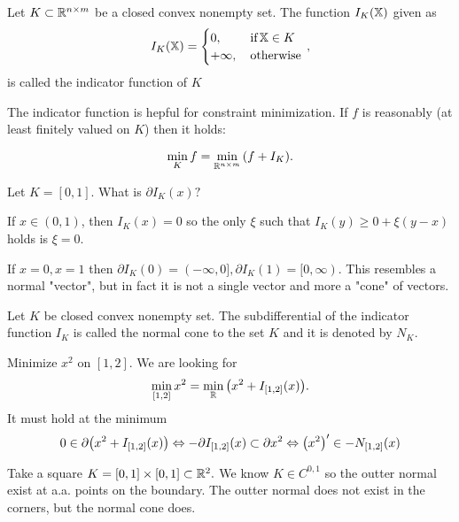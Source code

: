 \documentclass[11pt]{scrartcl} %
\begin{document}
\begin{definition}
    Let $K \subset \R^{n \times m}$ be a closed convex nonempty set. The function $I_K\qty(\tensorq{X})$ given as
    \[
	    I_K\qty(\tensorq{X})=\begin{cases}
		    0, & \, \text{if} \, \tensorq{X} \in K \\
		    + \infty,& \, \text{otherwise} \,
	    \end{cases},
    \]
    is called the indicator function of $K$
\end{definition}

The indicator function is hepful for constraint minimization. If $f$ is reasonably (at least finitely valued on $K$) then it holds:

\[
	\min_K f = \min_{\R^{n \times m}}\qty(f + I_K).
\]

\begin{example}

	Let $K = [0,1].$ What is $\partial I_K(x)?$ 

	If $x \in (0,1)$, then $I_K(x) = 0$ so the only $\xi$ such that $I_K(y) \geq 0 + \xi (y-x)$ holds is $\xi = 0.$

	If $x = 0, x=1$ then $\partial I_K(0) = (-\infty, 0], \partial I_K(1) = [0, \infty).$ This resembles a normal "vector", but in fact it is not a single vector and more a "cone" of vectors.
\end{example}

\begin{definition}
    Let $K$ be closed convex nonempty set. The subdifferential of the indicator function $I_K$ is called the normal cone to the set $K$ and it is denoted by $N_K$.
\end{definition}

\begin{example}
	Minimize $x^{2}$ on $[1,2]$. We are looking for
	\[
		\min_{[1,2]}x^{2} = \min_{\R}\qty(x^{2}+I_{[1,2]}\qty(x)).
	\]
	It must hold at the minimum
	\[
		0 \in \partial \qty(x^{2}+I_{[1,2]}\qty(x)) \Leftrightarrow - \partial I_{[1,2]}(x) \subset \partial x^{2} \Leftrightarrow \qty(x^{2})' \in -N_{[1,2]}(x)
	\]
\end{example}

\begin{example}
	Take a square $K = [0,1] \times [0,1] \subset \R^2.$ We know $K \in C^{0,1}$ so the outter normal exist at a.a. points on the boundary. The outter normal does not exist in the corners, but the normal cone does.
	\begin{tikzpicture}
	\end{tikzpicture}
\end{example}
\end{document}
